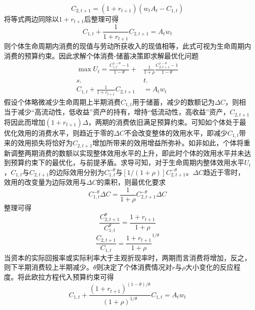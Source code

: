 \documentclass[supercite]{HustGraduPaper}
\begin{document}
    \begin{equation}
    C_{2,t+1}=(1+r_{t+1})(w_tA_t-C_{1,t})
    \end{equation}
    将等式两边同除以$1+r_{t+1}$后整理可得
    \begin{equation}
    C_{1,t}+\frac{1}{1+r_{t+1}}C_{2,t+1}=A_{t}w_{t}
    \end{equation}
    则个体生命周期内消费的现值与劳动所获收入的现值相等，此式可视为生命周期内消费的预算约束。因此求解个体消费-储蓄决策即求解最优化问题
    \begin{equation}
    \begin{aligned}
    \max U_{t}=\frac{C_{1,t}^{1-\theta}-1}{1-\theta}+&\frac{1}{1+\rho}\frac{C_{2,t+1}^{1-\theta}-1}{1-\theta}\\
    s.&t.\\
    C_{1,t}+\frac{1}{1+r_{t+1}}C_{2,t+1}&=A_{t}w_{t}
    \end{aligned}
    \end{equation}
    假设个体略微减少生命周期上半期消费$C_{1,t}$用于储蓄，减少的数额记为$\Delta C$，则相当于减少“高流动性，低收益”资产的持有，增持“低流动性，高收益”资产，$C_{2,t+1}$将因此而增加$(1+r_{t+1})\Delta$，两期的消费依旧满足预算约束。可知如个体处于最优化效用的消费水平，则趋近于零的$\Delta C$不会改变整体的效用水平，即减少$C_{1,t}$带来的效用损失将恰好为$C_{2,t+1}$增加所带来的效用增益所弥补。如非如此，个体将重新调整两期消费的数额以实现整体效用水平的上升，即此时个体的效用水平并未达到预算约束下的最优化，与前提矛盾。求导可知，对于生命周期内整体效用水平$U_{t}$，$C_{1,t}$与$C_{2,t+1}$的边际效用分别为$C_{1,t}^{-\theta}$与$[1/(1+\rho)]C_{2,t+1}^{-\theta}$。$\Delta C$趋近于零时，效用的改变量为边际效用与$\Delta C$的乘积，则最优化要求
    \begin{equation}
    C_{1,t}^{-\theta}\Delta C=\frac{1}{1+\rho}C_{2,t+1}^{-\theta}\Delta C
    \end{equation}
    整理可得
    \begin{equation}
    \frac{C_{2,t+1}^\theta}{C_{1,t}^\theta}=\frac{1+r_{t+1}}{1+\rho}
    \end{equation}
    \begin{equation}
    \frac{C_{2,t+1}}{C_{1,t}}=\frac{1+r_{t+1}}{1+\rho}^{1/\theta}
    \end{equation}
    当资本的实际回报率或实际利率大于主观折现率时，两期而言消费将增加，反之，则下半期消费较上半期减少。$\theta$则决定了个体消费情况对$r$与$\rho$大小变化的反应程度。将此欧拉方程代入预算约束可得
    \begin{equation}
    C_{1,t}+\frac{(1+r_{t+1})^{(1-\theta)/\theta}}{(1+\rho)^{1/\theta}}C_{1,t}=A_tw_t
    \end{equation}
\end{document}

